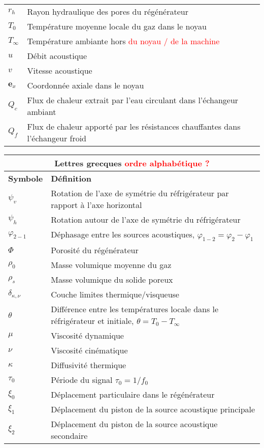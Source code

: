 \begin{center}
\begin{tabular}{ll}
        $r_h$ & Rayon hydraulique des pores du régénérateur \\
        $T_0$ & Température moyenne locale du gaz dans le noyau \\
        $T_\infty$ & Température ambiante hors \textcolor{red}{du noyau / de la machine} \\
        $u$ & Débit acoustique \\
        $v$ & Vitesse acoustique \\
        $\mathbf{e}_x$ & Coordonnée axiale dans le noyau \\
        $Q_c$ & Flux de chaleur extrait par l'eau circulant dans l'échangeur ambiant \\
        $Q_f$ & Flux de chaleur apporté par les résistances chauffantes dans l'échangeur froid\\\hline
    \end{tabular}
\end{center}

\newpage

\begin{center}
    \begin{tabular}{ll}
        \multicolumn{2}{c}{Lettres grecques \textcolor{red}{ordre alphabétique ?}}  \\\hline
        \textbf{Symbole} & \textbf{Définition} \\\hline\hline
        $\psi_v$ & Rotation de l'axe de symétrie du réfrigérateur par rapport à l'axe horizontal\\
        $\psi_h$ & Rotation autour de l'axe de symétrie du réfrigérateur \\
        $\varphi_{2-1}$ & Déphasage entre les sources acoustiques, $\varphi_{1-2} = \varphi_2 - \varphi_1$\\
        $\Phi$ & Porosité du régénérateur \\
        $\rho_0$ & Masse volumique moyenne du gaz \\
        $\rho_{s}$ & Masse volumique du solide poreux\\
        $\delta_{\kappa,\nu}$ & Couche limites thermique/visqueuse \\
        $\theta$ & Différence entre les températures locale dans le réfrigérateur et initiale, $\theta=T_0-T_\infty$\\
        $\mu$ & Viscosité dynamique \\
        $\nu$ & Viscosité cinématique \\
        $\kappa$ & Diffusivité thermique \\
        $\tau_0$ & Période du signal $\tau_0 = 1/f_0$ \\
        $\xi_0$ & Déplacement particulaire dans le régénérateur \\
        $\xi_1$ & Déplacement du piston de la source acoustique principale \\
        $\xi_2$ & Déplacement du piston de la source acoustique secondaire \\\hline
    \end{tabular}
\end{center}

